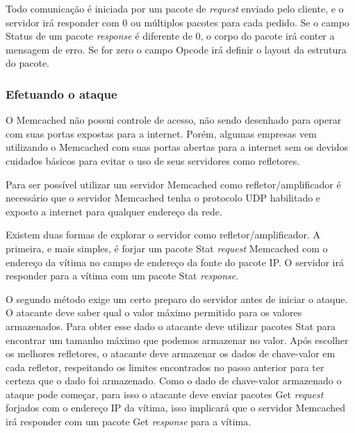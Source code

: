 Todo comunicação é iniciada por um pacote de \textit{request} enviado pelo cliente, e o servidor irá responder com 0 ou múltiplos pacotes para cada pedido.  Se o campo Status de um pacote \textit{response} é diferente de 0, o corpo do pacote irá conter a mensagem de erro. Se for zero o campo Opcode irá definir o layout da estrutura do pacote.

\subsubsection*{Efetuando o ataque}

O Memcached não possui controle de acesso, não sendo desenhado para operar com suas portas expostas para a internet. Porém, algumas empresas vem utilizando o Memcached com suas portas abertas para a internet sem os devidos cuidados básicos para evitar o uso de seus servidores como refletores.

Para ser possível utilizar um servidor Memcached como refletor/amplificador é necessário que o servidor Memcached tenha o protocolo UDP habilitado e exposto a internet para qualquer endereço da rede. 

Existem duas formas de explorar o servidor como refletor/amplificador. A primeira, e mais simples, é forjar um pacote Stat \textit{request} Memcached com o endereço da vítima no campo de endereço da fonte do pacote IP. O servidor irá responder para a vítima com um pacote Stat \textit{response}.

O segundo método exige um certo preparo do servidor antes de iniciar o ataque. O atacante deve saber qual o valor máximo permitido para os valores armazenados. Para obter esse dado o atacante deve utilizar pacotes Stat para encontrar um tamanho máximo que podemos armazenar no valor. Após escolher os melhores refletores, o atacante deve armazenar os dados de chave-valor em cada refletor, respeitando os limites encontrados no passo anterior para ter certeza que o dado foi armazenado. Como o dado de chave-valor armazenado o ataque pode começar, para isso o atacante deve enviar pacotes Get \textit{request} forjados com o endereço IP da vítima, isso implicará que o servidor Memcached irá responder com um pacote Get \textit{response} para a vítima.

